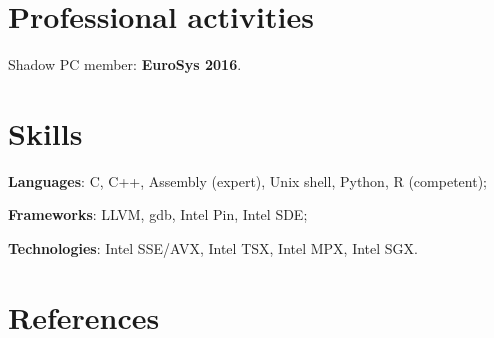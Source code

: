 \documentclass[letterpaper]{article}
\renewenvironment{itemize}{
  \begin{list}{}{
    \setlength{\leftmargin}{1.5em}
  }
}{
  \end{list}
}
\begin{document}
\section*{Professional activities}


\begin{itemize}
 \item { Shadow PC member:} {\bf EuroSys 2016}.
\end{itemize}
  




\section*{Skills}
\begin{itemize}
	\item {\bf Languages}: C, C++, Assembly (expert), Unix shell, Python, R (competent);
	\item {\bf Frameworks}: LLVM, gdb, Intel Pin, Intel SDE;
	\item {\bf Technologies}: Intel SSE/AVX, Intel TSX, Intel MPX, Intel SGX.
\end{itemize}


\section*{References}
\end{document}
